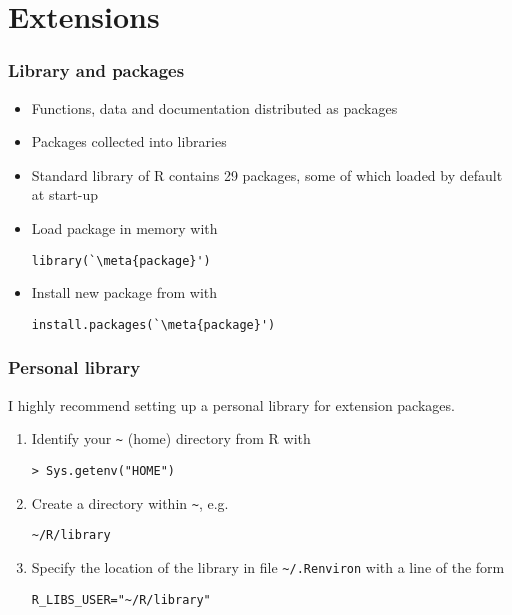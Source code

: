\section{Extensions}

\begin{frame}[fragile=singleslide]
  \frametitle{Library and packages}

  \begin{itemize}
  \item Functions, data and documentation distributed as \alert{packages}
  \item Packages collected into \alert{libraries}
  \item Standard library of R contains 29 packages, some of which
    loaded by default at start-up
  \item Load package in memory with
    \begin{Schunk}
\begin{lstlisting}
library(`\meta{package}')
\end{lstlisting}
    \end{Schunk}
  \item Install new package from
     with
    \begin{Schunk}
\begin{lstlisting}
install.packages(`\meta{package}')
\end{lstlisting}
    \end{Schunk}
  \end{itemize}
\end{frame}

\begin{frame}[fragile]
  \frametitle{Personal library}

  I highly recommend setting up a personal library for extension
  packages.

  \begin{enumerate}
  \item Identify your \verb=~= (\alert{home}) directory from R with
    \begin{Schunk}
\begin{lstlisting}
> Sys.getenv("HOME")
\end{lstlisting}
    \end{Schunk}
  \item Create a directory within \verb=~=, e.g.
    \begin{Schunk}
\begin{lstlisting}
~/R/library
\end{lstlisting}
    \end{Schunk}
  \item Specify the location of the library in file
    \verb=~/.Renviron= with a line of the form
    \begin{Schunk}
\begin{lstlisting}
R_LIBS_USER="~/R/library"
\end{lstlisting}
    \end{Schunk}
  \end{enumerate}

  \pause
\end{frame}

